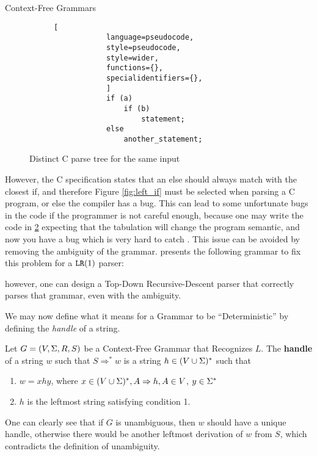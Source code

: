 \begin{section}{Context-Free Grammars}
\begin{figure}[ht]
\begin{subfigure}[b]{0.40\textwidth}
    \end{subfigure}
    \begin{subfigure}[b]{0.40\textwidth}
		\begin{lstlisting}[
			language=pseudocode,
			style=pseudocode,
			style=wider,
			functions={},
			specialidentifiers={},
			]
			if (a)
				if (b)
					statement;
			else
				another_statement;
		\end{lstlisting}
        \caption{\label{fig:right_if}}
\end{subfigure}
\caption{Distinct C parse tree for the same input}
\end{figure}

However, the C specification states that an else should always match with the closest
if, and therefore Figure \ref{fig:left_if} must be selected
when parsing a C program, or else the compiler has a bug. This can lead
to some unfortunate bugs in the code if the programmer is not careful enough,
because one may write the code in \ref{fig:right_if} expecting that the
tabulation will change the program semantic, and now you have a bug which is
very hard to catch \citep{ritchie1988c}. This issue can be avoided by removing the
ambiguity of the grammar. \cite{dragonbook} presents the following grammar
to fix this problem for a $\texttt{LR}(1)$ parser:
\vspace*{-0.5cm}

however, one can design a Top-Down Recursive-Descent parser that correctly
parses that grammar, even with the ambiguity.

We may now define what it means for a Grammar to be ``Deterministic'' by
defining the \textit{handle} of a string.

\begin{definition}
	Let $G = (V, \Sigma, R, S)$ be a Context-Free Grammar that Recognizes $L$.
	The \textbf{handle} of a string $w$ such that $S \Rightarrow^* w$ is a string
	$h \in (V \cup \Sigma)^*$ such that
	\begin{enumerate}
	  \item $w = xhy$, where $x \in (V \cup \Sigma)^*, A \Rightarrow h, A \in V$,
	  $y \in \Sigma^*$
	  \item $h$ is the leftmost string satisfying condition 1.
	\end{enumerate}
\end{definition}

One can clearly see that if $G$ is unambiguous, then $w$ should have a unique
handle, otherwise there would be another leftmost derivation of $w$ from $S$, which
contradicts the definition of unambiguity.


\end{section}
